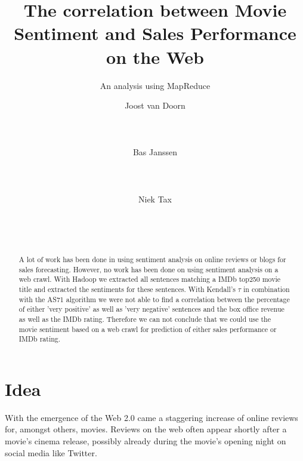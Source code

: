 \documentclass{sig-alternate-br}
\begin{document}

\title{The correlation between Movie Sentiment and Sales Performance on the Web}
\subtitle{An analysis using MapReduce}

\author{
\alignauthor Joost van Doorn\\
       \\
       \\
       \\
\alignauthor Bas Janssen\\
       \\
       \\
       \\
\alignauthor Niek Tax\\
       \\
       \\
       \\
}

\maketitle
\begin{abstract}
A lot of work has been done in using sentiment analysis on online reviews or blogs for sales forecasting. However, no work has been done on using sentiment analysis on a web crawl. With Hadoop we extracted all sentences matching a IMDb top250 movie title and extracted the sentiments for these sentences. With Kendall's $\tau$ in combination with the AS71 algorithm we were not able to find a correlation between the percentage of either 'very positive' as well as 'very negative' sentences and the box office revenue as well as the IMDb rating. Therefore we can not conclude that we could use the movie sentiment based on a web crawl for prediction of either sales performance or IMDb rating.
\end{abstract} 


\section{Idea}
With the emergence of the Web 2.0 came a staggering increase of online reviews for, amongst others, movies. Reviews on the web often appear shortly after a movie's cinema release, possibly already during the movie's opening night on social media like Twitter. 
\end{document}
